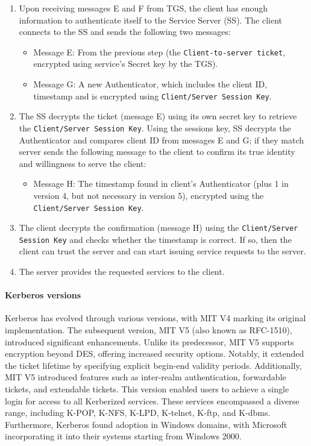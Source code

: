 \begin{enumerate}
	\item Upon receiving messages E and F from TGS, the client has enough information to authenticate itself to the Service Server (SS). The client connects to the SS and sends the following two messages:

	      \begin{itemize}
		      \item Message E: From the previous step (the \texttt{Client-to-server ticket}, encrypted using service's Secret key by the TGS).
		      \item Message G: A new Authenticator, which includes the client ID, timestamp and is encrypted using \texttt{Client/Server Session Key}.
	      \end{itemize}

	\item  The SS decrypts the ticket (message E) using its own secret key to retrieve the \texttt{Client/Server Session Key}. Using the sessions key, SS decrypts the Authenticator and compares client ID from messages E and G; if they match server sends the following message to the client to confirm its true identity and willingness to serve the client:

	      \begin{itemize}
		      \item Message H: The timestamp found in client's Authenticator (plus 1 in version 4, but not necessary in version 5), encrypted using the \texttt{Client/Server Session Key}.
	      \end{itemize}

	\item The client decrypts the confirmation (message H) using the \texttt{Client/Server Session Key} and checks whether the timestamp is correct. If so, then the client can trust the server and can start issuing service requests to the server.
	\item The server provides the requested services to the client.
\end{enumerate}


\paragraph{Kerberos versions}
Kerberos has evolved through various versions, with MIT V4 marking its original implementation. The subsequent version, MIT V5 (also known as RFC-1510), introduced significant enhancements.
Unlike its predecessor, MIT V5 supports encryption beyond DES, offering increased security options. Notably, it extended the ticket lifetime by specifying explicit begin-end validity periods.
Additionally, MIT V5 introduced features such as inter-realm authentication, forwardable tickets, and extendable tickets. This version enabled users to achieve a single login for access to all Kerberized services. These services encompassed a diverse range, including K-POP, K-NFS, K-LPD, K-telnet, K-ftp, and K-dbms.
Furthermore, Kerberos found adoption in Windows domains, with Microsoft incorporating it into their systems starting from Windows 2000.

